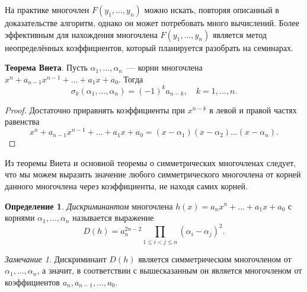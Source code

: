 \documentclass[a4paper,10pt]{amsart}
\theoremstyle{definition}
\newtheorem{definition}{Определение}
\theoremstyle{remark}
\newtheorem{remark}{Замечание}
\begin{document}
На практике многочлен $F(y_1, \ldots, y_n)$ можно искать, повторяя
описанный в доказательстве алгоритм, однако он может потребовать
много вычислений. Более эффективным для нахождения многочлена
$F(y_1, \ldots, y_n)$ является метод неопределённых коэффициентов,
который планируется разобрать на семинарах.

{\bf Теорема Виета}. Пусть $\alpha_1,\ldots,\alpha_n$~--- корни
многочлена $x^n + a_{n-1}x^{n-1} + \dots + a_1x + a_0$. Тогда
$$
\sigma_k(\alpha_1,\ldots,\alpha_n)=(-1)^k a_{n-k}, \quad k = 1,
\ldots, n.
$$

\begin{proof}
Достаточно приравнять коэффициенты при $x^{n-k}$ в левой и правой
частях равенства
$$
x^n+a_{n-1}x^{n-1}+\dots+a_1x+a_0=(x-\alpha_1)(x-\alpha_2)\ldots
(x-\alpha_n).
$$
\end{proof}

Из теоремы Виета и основной теоремы о симметрических многочленах
следует, что мы можем выразить значение любого симметрического
многочлена от корней данного многочлена через коэффициенты, не
находя самих корней.

\begin{definition}
{\it Дискриминантом} многочлена $h(x)=a_nx^n+\ldots+a_1x+a_0$ с
корнями $\alpha_1, \ldots, \alpha_n$ называется выражение
$$
D(h) = a_n^{2n-2} \prod \limits_{1 \leqslant i < j \leqslant n}
(\alpha_i - \alpha_j)^2.
$$
\end{definition}

\begin{remark}
Дискриминант $D(h)$ является симметрическим многочленом от
$\alpha_1, \ldots, \alpha_n$, а значит, в соответствии с
вышесказанным он является многочленом от коэффициентов $a_n,
a_{n-1}, \ldots, a_0$.
\end{remark}
\end{document}
